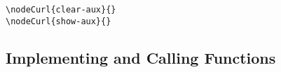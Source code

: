 \begin{verbatim}
\nodeCurl{clear-aux}{}
\nodeCurl{show-aux}{}
\end{verbatim}


\subsection{Implementing and Calling Functions}\label{functions}

\renewcommand{\CXLTXparameterSplitter}{!}








